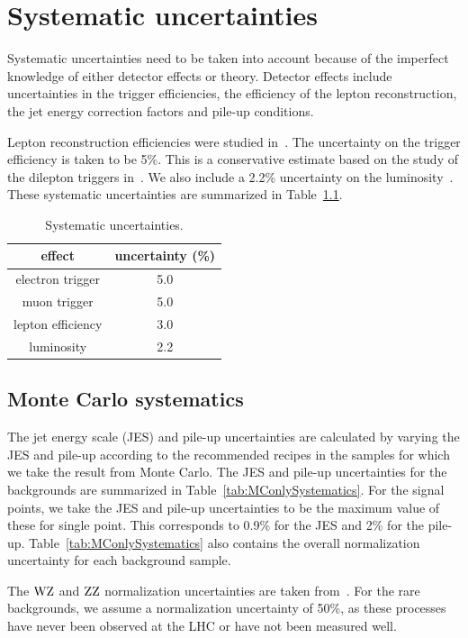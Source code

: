 \chapter{Systematic uncertainties}\label{chap:systematics}
Systematic uncertainties need to be taken into account because of the
imperfect knowledge of either detector effects or theory.
Detector effects include uncertainties in the trigger efficiencies, the
efficiency of the lepton reconstruction, the jet energy correction factors
and pile-up conditions.

Lepton reconstruction efficiencies were studied in~\cite{CMS-EXO-12-001}. The uncertainty on the trigger
efficiency is taken to be 5\%. This is a conservative estimate based on the study of the dilepton triggers in~\cite{bprime2011}. We also include a 2.2\% uncertainty 
on the luminosity~\cite{CMS-SMP-12-008}. These systematic uncertainties are summarized in Table~\ref{tab:Systematics}.

\begin{table}
    \centering
\begin{tabular}{*2c}
    \toprule
          effect & uncertainty (\%) \\
          \midrule
  electron trigger          & 5.0 \\
  muon trigger              & 5.0 \\
  lepton efficiency         & 3.0 \\
  luminosity                & 2.2 \\
  \bottomrule
\end{tabular}
\caption{Systematic uncertainties.}
\label{tab:Systematics}
\end{table}

\section{Monte Carlo systematics}
The jet energy scale (JES) and pile-up uncertainties are calculated by
varying the JES and pile-up according to the recommended recipes in the samples for which 
we take the result from Monte Carlo. The JES and pile-up uncertainties for the backgrounds are 
summarized in Table~\ref{tab:MConlySystematics}. For the signal points, we
take the JES and pile-up uncertainties to be the maximum value of these for single
point. This corresponds to 0.9\% for the JES and 2\% for the pile-up. Table~\ref{tab:MConlySystematics} also
contains the overall normalization uncertainty for each background sample.

The $\mathrm{W}\mathrm{Z}$ and $\mathrm{Z}\mathrm{Z}$ normalization uncertainties are taken from~\cite{CMS-AN-2011-333}. 
For the rare backgrounds, we assume a normalization uncertainty of 50\%, as
these processes have never been observed at the LHC or have not been
measured well.

